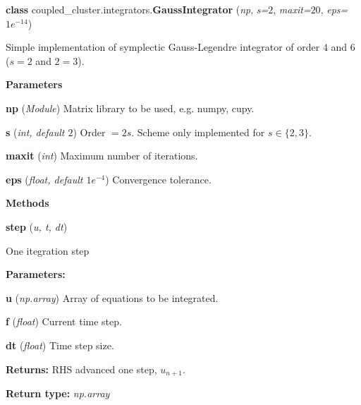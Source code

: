 \begin{tcolorbox}
    {\selectfont
    \textbf{class} coupled\_cluster.integrators.\textbf{GaussIntegrator}
    (\emph{np}, \emph{s=$2$}, \emph{maxit=$20$}, \emph{eps=$1e^{-14}$})

    \vspace{1em}
    Simple implementation of symplectic Gauss-Legendre integrator
    of order $4$ and $6$ ($s=2$ and $2=3$).
    
    \vspace{1em}
    \textbf{Parameters}

    \hspace{2em} \textbf{np} (\emph{Module})
        Matrix library to be used, e.g. numpy, cupy.

    \hspace{2em} \textbf{s} (\emph{int, default $2$})
        Order $= 2s$. Scheme only implemented for $s\in\{2, 3\}$.

    \hspace{2em} \textbf{maxit} (\emph{int})
        Maximum number of iterations.

    \hspace{2em} \textbf{eps} (\emph{float, default $1e^{-4}$})
        Convergence tolerance.

    \vspace{1em} 
    \textbf{Methods}

    \hspace{2em} \textbf{step} (\emph{u, t, dt})

        \begin{adjustwidth}{4em}{}
        One itegration step

        \textbf{Parameters:} 
        
            \hspace{1.5em} \textbf{u} (\emph{np.array}) Array of equations to be integrated.

            \hspace{1.5em} \textbf{f} (\emph{float}) Current time step.

            \hspace{1.5em} \textbf{dt} (\emph{float}) Time step size.

        \textbf{Returns:} RHS advanced one step, $u_{n+1}$.
        
        \textbf{Return type:} \emph{np.array}

        \end{adjustwidth}


}
\end{tcolorbox}
